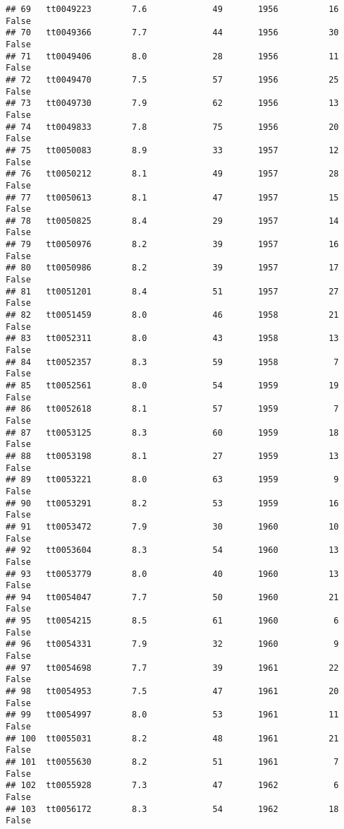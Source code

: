 \documentclass[
]{article}
\begin{document}
\begin{verbatim}
## 69   tt0049223        7.6             49       1956          16   False
## 70   tt0049366        7.7             44       1956          30   False
## 71   tt0049406        8.0             28       1956          11   False
## 72   tt0049470        7.5             57       1956          25   False
## 73   tt0049730        7.9             62       1956          13   False
## 74   tt0049833        7.8             75       1956          20   False
## 75   tt0050083        8.9             33       1957          12   False
## 76   tt0050212        8.1             49       1957          28   False
## 77   tt0050613        8.1             47       1957          15   False
## 78   tt0050825        8.4             29       1957          14   False
## 79   tt0050976        8.2             39       1957          16   False
## 80   tt0050986        8.2             39       1957          17   False
## 81   tt0051201        8.4             51       1957          27   False
## 82   tt0051459        8.0             46       1958          21   False
## 83   tt0052311        8.0             43       1958          13   False
## 84   tt0052357        8.3             59       1958           7   False
## 85   tt0052561        8.0             54       1959          19   False
## 86   tt0052618        8.1             57       1959           7   False
## 87   tt0053125        8.3             60       1959          18   False
## 88   tt0053198        8.1             27       1959          13   False
## 89   tt0053221        8.0             63       1959           9   False
## 90   tt0053291        8.2             53       1959          16   False
## 91   tt0053472        7.9             30       1960          10   False
## 92   tt0053604        8.3             54       1960          13   False
## 93   tt0053779        8.0             40       1960          13   False
## 94   tt0054047        7.7             50       1960          21   False
## 95   tt0054215        8.5             61       1960           6   False
## 96   tt0054331        7.9             32       1960           9   False
## 97   tt0054698        7.7             39       1961          22   False
## 98   tt0054953        7.5             47       1961          20   False
## 99   tt0054997        8.0             53       1961          11   False
## 100  tt0055031        8.2             48       1961          21   False
## 101  tt0055630        8.2             51       1961           7   False
## 102  tt0055928        7.3             47       1962           6   False
## 103  tt0056172        8.3             54       1962          18   False

\end{verbatim}
\end{document}

